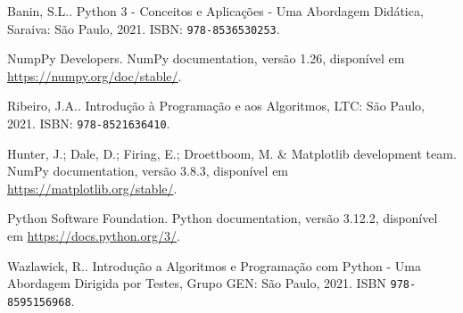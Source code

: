 \documentclass[a4paper,10pt,twoside]{article}
\begin{document}
\begin{thebibliography}{99}

  Banin, S.L.. Python 3 - Conceitos e Aplicações - Uma Abordagem Didática, Saraiva: São Paulo, 2021. ISBN: \texttt{978-8536530253}.

  NumpPy Developers. NumPy documentation, versão 1.26, disponível em \url{https://numpy.org/doc/stable/}.

  Ribeiro, J.A.. Introdução à Programação e aos Algoritmos, LTC: São Paulo, 2021. ISBN: \texttt{978-8521636410}.

  Hunter, J.; Dale, D.; Firing, E.; Droettboom, M. \& Matplotlib development team. NumPy documentation, versão 3.8.3, disponível em \url{https://matplotlib.org/stable/}.
    
  Python Software Foundation. Python documentation, versão 3.12.2, disponível em \url{https://docs.python.org/3/}.

  Wazlawick, R.. Introdução a Algoritmos e Programação com Python - Uma Abordagem Dirigida por Testes, Grupo GEN: São Paulo, 2021. ISBN \texttt{978-8595156968}.

\end{thebibliography}
  
\newpage
\printindex
\end{document}
